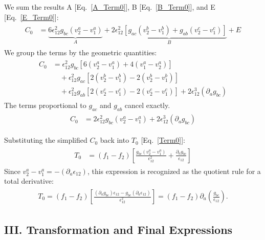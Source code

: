 \documentclass[twocolumn, prx, reprint, amsfonts, amsmath, amssymb, longbibliography, floatfix, aps]{revtex4-2}
\begin{document}
We sum the results A [Eq.~\eqref{A_Term0}], B [Eq.~\eqref{B_Term0}], and E [Eq.~\eqref{E_Term0}]:
\begin{align}
\begin{aligned}
C_0 &= \underbrace{6\epsilon_{12}^2 g_{bc} (v_2^a - v_1^a)}_{A} + \underbrace{2\epsilon_{12}^2 [ g_{ac}(v_2^b-v_1^b) + g_{ab}(v_2^c-v_1^c) ]}_{B} + E
\end{aligned}
\end{align}
We group the terms by the geometric quantities:
\begin{align}
\begin{aligned}
C_0 &= \epsilon_{12}^2 g_{bc} [ 6(v_2^a-v_1^a) + 4(v_1^a-v_2^a) ] \\
& \quad + \epsilon_{12}^2 g_{ac} [ 2(v_2^b-v_1^b) - 2(v_2^b-v_1^b) ] \\
& \quad + \epsilon_{12}^2 g_{ab} [ 2(v_2^c-v_1^c) - 2(v_2^c-v_1^c) ] + 2\epsilon_{12}^3 (\partial_a g_{bc})
\end{aligned}
\end{align}
The terms proportional to $g_{ac}$ and $g_{ab}$ cancel exactly.
\begin{align}
\begin{aligned}
C_0 &= 2\epsilon_{12}^2 g_{bc} (v_2^a-v_1^a) + 2\epsilon_{12}^3 (\partial_a g_{bc})
\end{aligned}
\end{align}

Substituting the simplified $C_0$ back into $T_0$ [Eq.~\eqref{Term0}]:
\begin{align}
\begin{aligned}
T_0 &= (f_1 - f_2) \left[ \frac{g_{bc} (v_2^a-v_1^a)}{\epsilon_{12}^2} + \frac{\partial_a g_{bc}}{\epsilon_{12}} \right]
\end{aligned}
\end{align}
Since $v_2^a-v_1^a = -(\partial_a \epsilon_{12})$, this expression is recognized as the quotient rule for a total derivative:
\begin{align}
\begin{aligned}
T_0 = (f_1 - f_2) \left[ \frac{(\partial_a g_{bc})\epsilon_{12} - g_{bc}(\partial_a \epsilon_{12})}{\epsilon_{12}^2} \right] = (f_1 - f_2) \partial_a \left( \frac{g_{bc}}{\epsilon_{12}} \right) .
\label{Term0-0}
\end{aligned}
\end{align}


\subsection*{III. Transformation and Final Expressions}
\label{Two-band Final Expression}
\end{document}
